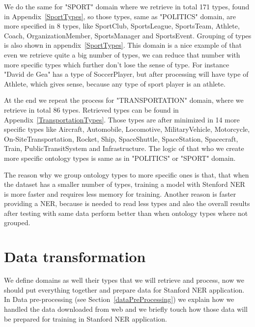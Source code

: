\documentclass[thesis=M,english]{FITthesis}[2018/05/30]
\begin{document}
	We do the same for "SPORT" domain where we retrieve in total 171 types, found in Appendix~\ref{SportTypes}, so those types, same as "POLITICS" domain, are more specified in 8 types, like SportClub, SportsLeague, SportsTeam, Athlete, Coach, OrganizationMember, SportsManager and SportsEvent. Grouping of types is also shown in appendix~\ref{SportTypes}. This domain is a nice example of that even we retrieve quite a big number of types, we can reduce that number with more specific types which further don't lose the sense of type. For instance "David de Gea" has a type of SoccerPlayer, but after processing will have type of Athlete, which gives sense, because any type of sport player is an athlete.

	At the end we repeat the process for "TRANSPORTATION" domain, where we retrieve in total 86 types. Retrieved types can be found in Appendix~\ref{TransportationTypes}. Those types are after minimized in 14 more specific types like Aircraft, Automobile, Locomotive, MilitaryVehicle, Motorcycle, On-SiteTransportation, Rocket, Ship, SpaceShuttle, SpaceStation, Spacecraft, Train, PublicTransitSystem and Infrastructure. The logic of that who we create more specific ontology types is same as in "POLITICS" or "SPORT" domain.   

	The reason why we group ontology types to more specific ones is that, that when the dataset has a smaller number of types, training a model with Stenford NER is more faster and requires less memory for training. Another reason is faster providing a NER, because is needed to read less types and also the overall results after testing with same data perform better than when ontology types where not grouped.

\section{Data transformation}\label{StanfordNERoutput}
	We define domains as well their types that we will retrieve and process, now we should put everything together and prepare data for Stanford NER application. In Data pre-processing (see Section~\ref{dataPreProcessing}) we explain how we handled the data downloaded from web and we briefly touch how those data will be prepared for training in Stanford NER application. 
\end{document}
